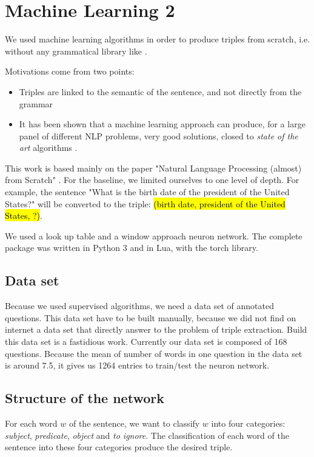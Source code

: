 \section{Machine Learning 2}


We used machine learning algorithms in order to produce triples from scratch, i.e. without any grammatical library like \Stanford.

Motivations come from two points:
\begin{itemize}
\item Triples are linked to the semantic of the sentence, and not directly from the grammar
\item It has been shown that a machine learning approach can produce, for a large panel of different NLP problems, very good solutions, closed to \textit{state of the art} algorithms \cite{collobert}.
\end{itemize}

This work is based mainly on the paper "Natural Language Processing (almost) from Scratch" \cite{collobert}.
For the baseline, we limited ourselves to one level of depth.
For example, the sentence "What is the birth date of the president of the United States?" will be converted to the triple: 
\hl{(birth date, president of the United States, ?)}. 

We used a look up table and a window approach neuron network. The complete package was written in Python 3 and in Lua, with the torch library.

\subsection{Data set}

Because we used supervised algorithms, we need a data set of annotated questions.
This data set have to be built manually, because we did not find on internet a data set that directly answer to the problem of triple extraction.
Build this data set is a fastidious work. Currently our data set is composed of 168 questions.
Because the mean of number of words in one question in the data set is around 7.5, it gives us 1264 entries to train/test the neuron network.

\subsection{Structure of the network}

For each word $w$ of the sentence, we want to classify $w$ into four categories: \textit{subject}, \textit{predicate}, \textit{object} and \textit{to ignore}.
The classification of each word of the sentence into these four categories produce the desired triple.

